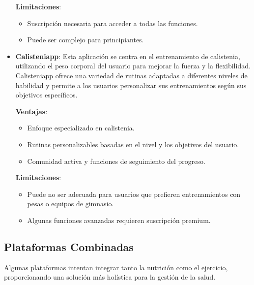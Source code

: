 \begin{itemize}
    \textbf{Limitaciones}:
    \begin{itemize}
      \item Suscripción necesaria para acceder a todas las funciones.
      \item Puede ser complejo para principiantes.
    \end{itemize}
  
  \item \textbf{Calisteniapp}: Esta aplicación se centra en el entrenamiento de calistenia, utilizando el peso corporal del usuario para mejorar la fuerza y la flexibilidad. Calisteniapp ofrece una variedad de rutinas adaptadas a diferentes niveles de habilidad y permite a los usuarios personalizar sus entrenamientos según sus objetivos específicos.

    \textbf{Ventajas}:
    \begin{itemize}
      \item Enfoque especializado en calistenia.
      \item Rutinas personalizables basadas en el nivel y los objetivos del usuario.
      \item Comunidad activa y funciones de seguimiento del progreso.
    \end{itemize}

    \textbf{Limitaciones}:
    \begin{itemize}
      \item Puede no ser adecuada para usuarios que prefieren entrenamientos con pesas o equipos de gimnasio.
      \item Algunas funciones avanzadas requieren suscripción premium.
    \end{itemize}
\end{itemize}

\subsection{Plataformas Combinadas}

Algunas plataformas intentan integrar tanto la nutrición como el ejercicio, proporcionando una solución más holística para la gestión de la salud.

